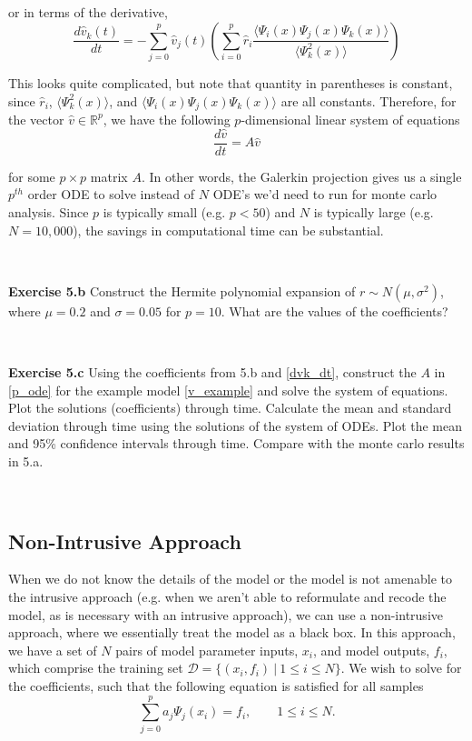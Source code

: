 \documentclass[11pt]{article}
\numberwithin{equation}{section}
\begin{document}
or in terms of the derivative,
\begin{equation}
\frac{d\hat{v}_k(t)}{dt} = - \sum_{j=0}^p \hat{v}_j(t) \left( \sum_{i=0}^p \hat{r}_i \frac{\langle \Psi_i(x) \Psi_j(x) \Psi_k(x) \rangle}{\langle \Psi_k^2(x) \rangle } \right) \label{dvk_dt}
\end{equation}

This looks quite complicated, but note that quantity in parentheses is constant, since $\hat{r}_i$, $\langle \Psi_k^2(x) \rangle$, and $\langle \Psi_i(x) \Psi_j(x) \Psi_k(x) \rangle$ are all constants. Therefore, for the vector $\hat{v} \in \mathbb{R}^p$, we have the following $p$-dimensional linear system of equations
\begin{equation}
\frac{d \hat{v}}{dt} = A \hat{v} \label{p_ode}
\end{equation}

for some $p \times p$ matrix $A$. In other words, the Galerkin projection gives us a single $p^{th}$ order ODE to solve instead of $N$ ODE's we'd need to run for monte carlo analysis. Since $p$ is typically small (e.g. $p < 50$) and $N$ is typically large (e.g. $N = 10,000$), the savings in computational time can be substantial.

\

\textbf{Exercise 5.b} Construct the Hermite polynomial expansion of $r \sim N(\mu, \sigma^2)$, where $\mu = 0.2$ and $\sigma = 0.05$ for $p = 10$. What are the values of the coefficients?

\

\textbf{Exercise 5.c} Using the coefficients from 5.b and \eqref{dvk_dt}, construct the $A$ in \eqref{p_ode} for the example model \eqref{v_example} and solve the system of equations. Plot the solutions (coefficients) through time. Calculate the mean and standard deviation through time using the solutions of the system of ODEs. Plot the mean and 95\% confidence intervals through time. Compare with the monte carlo results in 5.a.

\




\subsection{Non-Intrusive Approach}

When we do not know the details of the model or the model is not amenable to the intrusive approach (e.g. when we aren't able to reformulate and recode the model, as is necessary with an intrusive approach), we can use a non-intrusive approach, where we essentially treat the model as a black box. In this approach, we have a set of $N$ pairs of model parameter inputs, $x_i$, and model outputs, $f_i$, which comprise the training set $\mathcal{D} = \{ (x_i, f_i) \ | \ 1 \leq i \leq N \}$. We wish to solve for the coefficients, such that the following equation is satisfied for all samples
\begin{equation}
\sum_{j=0}^{p}  a_j \Psi_j(x_i) = f_i, \qquad 1 \leq i \leq N. \label{pce_train} 
\end{equation}
\end{document}
